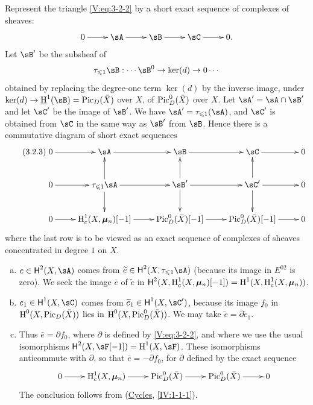 Represent the triangle \eqref{V:eq:3-2-2} by a short exact sequence of
complexes of sheaves:
\[\xymatrix{
  0 \ar[r]
    & \sA \ar[r]
    & \sB \ar[r]
    & \sC \ar[r]
    & 0 \text{.}
}\]
Let $\sB'$ be the subsheaf of
\[
  \tau_{\leqslant 1} \sB : \cdots \sB^0 \to \ker(d) \to 0 \cdots
\]
obtained by replacing the degree-one term $\ker(d)$ by the inverse image, under
$\ker(d)\to \underline\h^1(\sB) = \pic_D(\bar X)$ over $X$, of
$\operatorname{Pic}_D^0(\bar X)$ over $X$. Let $\sA'=\sA\cap \sB'$ and let $\sC'$ be the
image of $\sB'$. We have $\sA'=\tau_{\leqslant 1}(\sA)$, and $\sC'$ is
obtained from $\sC$ in the same way as $\sB'$ from $\sB$. Hence there is a
commutative diagram of short exact sequences
\begin{equation*}\tag{3.2.3}\label{V:eq:3-2-3}
\xymatrix{
  0 \ar[r]
    & \sA \ar[r]
    & \sB \ar[r]
    & \sC \ar[r]
    & 0 \\
  0 \ar[r]
    & \tau_{\leqslant 1} \sA \ar[r] \ar[u] \ar[d]
    & \sB' \ar[r] \ar[u] \ar[d]
    & \sC' \ar[r] \ar[u] \ar[d]
    & 0 \\
  0 \ar[r]
    & \h_c^1(X,\dmu_n)[-1] \ar[r]
    & \pic_D^0(\bar X)[-1] \ar[r]
    & \pic_D^0(\bar X)[-1] \ar[r]
    & 0
}
\end{equation*}
where the last row is to be viewed as an exact sequence of complexes of
sheaves concentrated in degree $1$ on $X$.
\begin{enumerate}[a)]
  \item $e\in \hh^2(X,\sA)$ comes from
    $\widetilde e\in \hh^2(X,\tau_{\leqslant 1}\sA)$ (because its image in
    $E^{02}$ is zero). We seek the image $\bar e$ of $\widetilde e$ in
    $\operatorname{\mathsf{H}}^2(X,\operatorname{H}_c^1(X,{\bm\mu}_n)[-1]) = \operatorname{H}^1(X,\operatorname{H}_c^1(X,{\bm\mu}_n))$.
  \item $e_1\in \hh^1(X,\sC)$ comes from
    $\widetilde e_1\in \hh^1(X,\sC')$, because its image $f_0$ in
    $\operatorname{H}^0(X,\operatorname{Pic}_D(\bar X))$ lies in $\operatorname{H}^0(X,\operatorname{Pic}_D^0(\bar X))$. We may
    take $\widetilde e=\partial \widetilde e_1$.
  \item Thus $\bar e = \partial f_0$, where $\partial$ is defined by
    \eqref{V:eq:3-2-2}, and where we use the usual isomorphisms
    $\hh^2(X,\sF[-1]) = \h^1(X,\sF)$. These isomorphisms anticommute with
    $\partial$, so that $\bar e=-\partial f_0$, for $\partial$ defined by
    the exact sequence
    \[\xymatrix{
      0 \ar[r]
        & \h_c^1(X,\dmu_n) \ar[r]
        & \pic_D^0(\bar X) \ar[r]
        & \pic_D^0(\bar X) \ar[r]
        & 0
    }\]
    The conclusion follows from (\hyperref[IV]{Cycles}, \ref{IV:1-1-1}).
\end{enumerate}


